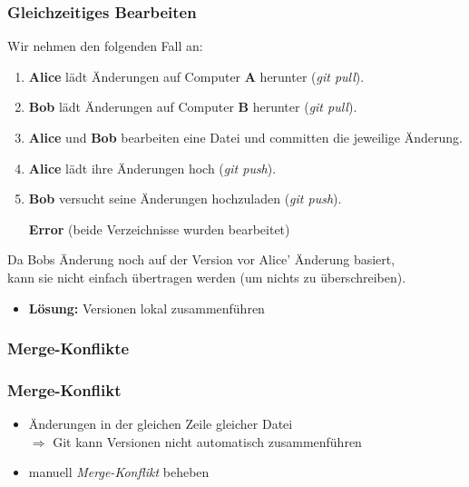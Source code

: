 \documentclass[accentcolor=tud8b,colorbacktitle,inverttitle,landscape,german,presentation,t]{tudbeamer}
\begin{document}
			\begin{frame}
				\frametitle{Gleichzeitiges Bearbeiten}
				Wir nehmen den folgenden Fall an:
				\begin{enumerate}
					\item \textbf{Alice} lädt Änderungen auf Computer \textbf{A} herunter (\textit{git pull}).
					\pause
					\item \textbf{Bob} lädt Änderungen auf Computer \textbf{B} herunter (\textit{git pull}).
					\pause
					\item \textbf{Alice} und \textbf{Bob} bearbeiten eine Datei und committen die jeweilige Änderung.
					\pause
					\item \textbf{Alice} lädt ihre Änderungen hoch (\textit{git push}).
					\pause
					\item \textbf{Bob } versucht seine Änderungen hochzuladen (\textit{git push}).
					\pause
					\item [\textbf{Error}] (beide Verzeichnisse wurden bearbeitet)
				\end{enumerate}
				
				Da Bobs Änderung noch auf der Version vor Alice' Änderung basiert,\\
				kann sie nicht einfach übertragen werden (um nichts zu überschreiben).\\
				\begin{itemize}
					\item \textbf{Lösung:} Versionen lokal zusammenführen
				\end{itemize}
			\end{frame}
			
		\subsubsection{Merge-Konflikte}
			\begin{frame}
				\frametitle{Merge-Konflikt}
					\begin{itemize}
						\item Änderungen in der gleichen Zeile gleicher Datei\\
						$\Rightarrow$ Git kann Versionen nicht automatisch zusammenführen
						\item manuell \textit{Merge-Konflikt} beheben
					\end{itemize}
			\end{frame}
			
\end{document}
